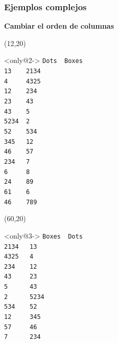 \documentclass{beamer}
\begin{document}
\begin{frame}[fragile,t]
  \frametitle{\small Ejemplos complejos}
\textbf{Cambiar el orden de columnas}
    \begin{textblock}{30}(12,20)
    \small {}\vspace{-0.4cm}
    \begin{block}<only@2->{\vspace*{-3ex}}
    \scriptsize
    \verb:Dots  Boxes:\\
    \verb:13    2134 :\\
    \verb:4     4325 :\\
    \verb:12    234  :\\
    \verb:23    43   :\\
    \verb:43    5    :\\
    \verb:5234  2    :\\
    \verb:52    534  :\\
    \verb:345   12   :\\
    \verb:46    57   :\\
    \verb:234   7    :\\
    \verb:6     8    :\\
    \verb:24    89   :\\
    \verb:61    6    :\\
    \verb:46    789  :\\
    \vspace*{0.5ex}
    \end{block}
    \end{textblock}
    \begin{textblock}{30}(60,20)
    \small {}\vspace{-0.4cm}
    \begin{block}<only@3->{\vspace*{-3ex}}
    \scriptsize
    \verb:Boxes  Dots:\\
    \verb:2134   13  :\\
    \verb:4325   4   :\\
    \verb:234    12  :\\
    \verb:43     23  :\\
    \verb:5      43  :\\
    \verb:2      5234:\\
    \verb:534    52  :\\
    \verb:12     345 :\\
    \verb:57     46  :\\
    \verb:7      234 :\\

\end{block}
\end{textblock}
\end{frame}
\end{document}
